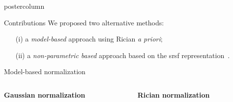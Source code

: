 \documentclass[final, size=a0]{beamer}
\begin{document}
\begin{frame}
\begin{columns}
\begin{column}{.33\textwidth}
\begin{beamercolorbox}[center,wd=\textwidth]{postercolumn}
\begin{minipage}[T]{.95\textwidth}
{            \vspace{.8cm}

            \begin{exampleblock}{Contributions}
              \justifying
              We proposed two alternative methods:
              \begin{itemize}
              \justifying
              \item[(i)] a \emph{model-based} approach using Rician \textit{a priori};
              \item[(ii)] a \emph{non-parametric based} approach based on the \ac{srsf} representation~\cite{Srivastava2011}.
              \end{itemize}
            \end{exampleblock}

            \vspace{.8cm}

            \begin{alertblock}{Model-based normalization}
              
              \begin{columns}
                \begin{column}{.5\textwidth}
                  
                  \begin{center}
                    \textbf{Gaussian normalization}
                  \end{center}

                \end{column}
                \begin{column}{.5\textwidth}
                  \begin{center}
                    \textbf{Rician normalization}
                  \end{center}
                  
                \end{column}
              \end{columns}



\end{alertblock}}
\end{minipage}
\end{beamercolorbox}
\end{column}
\end{columns}
\end{frame}
\end{document}
